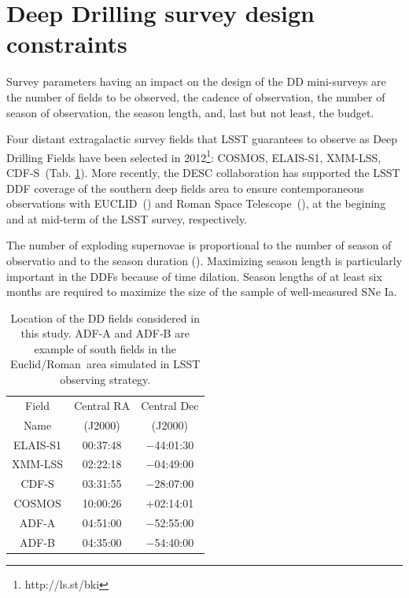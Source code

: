 \documentclass[\docopts]{\docclass}
\newcommand{\cosmos}{{COSMOS}}
\newcommand{\elais}{{ELAIS-S1}}
\newcommand{\xmm}{{XMM-LSS}}
\newcommand{\cdfs}{{CDF-S}}
\newcommand{\adfa}{{ADF-A}}
\newcommand{\adfb}{{ADF-B}}
\newcommand{\adfs}{{Euclid/Roman}}
\newcommand{\euclid}{{EUCLID}}
\newcommand{\romanspace}{{\sc Roman Space Telescope}}
\newcommand{\sne}{{SNe Ia}}
\begin{document}
\section{Deep Drilling survey design constraints}
\label{sec:design}
Survey parameters having an impact on the design of the DD mini-surveys are the number of fields to be observed, the cadence of observation, the number of season of observation, the season length, and, last but not least, the budget.
\par
Four distant extragalactic survey fields that LSST guarantees to observe as Deep Drilling Fields have been selected in 2012\footnote{http://ls.st/bki}: \cosmos, \elais, \xmm, \cdfs~(Tab. \ref{tab:locddf}). More recently, the DESC collaboration has supported the LSST DDF coverage of the southern deep fields area to ensure contemporaneous observations with \euclid~(\citealt{laureijs2011euclid,Amendola_2013}) and \romanspace~(\citealt{spergel2015widefield}), at the begining and at mid-term of the LSST survey, respectively.
\par
The number of exploding supernovae is proportional to the number of season of observatio and to the season duration (\citealt{perrett}). Maximizing season length is particularly important in the DDFs because of time dilation. Season lengths of at least six months are required to maximize the size of the sample of well-measured \sne.
\begin{table}[!htbp]
  \caption{Location of the DD fields considered in this study. ADF-A and ADF-B are example of south fields in the \adfs~area simulated in LSST observing strategy.}\label{tab:locddf}
  \begin{center}
    \begin{tabular}{c|c|c}
      \hline
      \hline
      Field & Central RA & Central Dec\\ 
      Name & (J2000)  & (J2000)\\
      \hline
     \elais & 00:37:48 & −44:01:30 \\
     \xmm & 02:22:18 &  −04:49:00 \\
     \cdfs & 03:31:55 & −28:07:00 \\
     \cosmos &10:00:26 & +02:14:01 \\
     \hline 
     \adfa & 04:51:00& −52:55:00 \\
     \adfb & 04:35:00 & −54:40:00 \\
      \hline
      \hline
      \end{tabular}
  \end{center}
\end{table}
\end{document}
